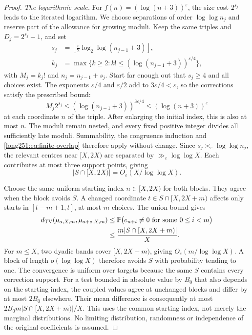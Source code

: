 \documentclass[11pt]{article}
\begin{document}
\begin{proof}
\par\medskip\noindent\emph{The logarithmic scale.}
For $f(n)=(\log(n+3))^\varepsilon$, the size cost $2^{s_j}$ leads to
the iterated logarithm.  We choose separations of order $\log\log n_j$
and reserve part of the allowance for growing moduli.  Keep the same
triples and $D_j=2^{s_j}-1$, and set
\begin{equation}\label{long251:eq:sparse-polylog-schedule}
 \begin{aligned}
 s_j&=\left\lfloor\frac{\varepsilon}{2}
               \log_2\log(n_{j-1}+3)\right\rfloor,\\
 k_j&=\max\{k\ge2:k!\le(\log(n_{j-1}+3))^{\varepsilon/4}\},
 \end{aligned}
\end{equation}
with $M_j=k_j!$ and $n_j=n_{j-1}+s_j$.  Start far enough out that
$s_j\ge4$ and all choices exist.  The exponents $\varepsilon/4$ and
$\varepsilon/2$ add to $3\varepsilon/4<\varepsilon$, so the corrections
satisfy the prescribed bound:
\[
 M_j2^{s_j}\le(\log(n_{j-1}+3))^{3\varepsilon/4}
             \le(\log(n+3))^\varepsilon
\]
at each coordinate $n$ of the triple.  After enlarging the initial
index, this is also at most $n$.  The moduli remain nested, and every fixed positive integer divides all
sufficiently late moduli.  Summability, the congruence induction and
\eqref{long251:eq:finite-overlap} therefore apply without change.  Since
$s_j\asymp_\varepsilon\log\log n_j$, the relevant centres near $[X,2X)$
are separated by $\gg_\varepsilon\log\log X$.  Each contributes at most
three support points, giving
\[
 |S\cap[X,2X)|=O_\varepsilon(X/\log\log X).
\]

Choose the same uniform starting index $n\in[X,2X)$ for both
blocks.  They agree when the block avoids $S$.  A changed coordinate
$t\in S\cap[X,2X+m)$ affects only starts in $[t-m+1,t]$, at most
$m$ choices.  The union bound gives
\[
 \begin{aligned}
 d_{\rm TV}(\mu_{a,X,m},\mu_{a+e,X,m})
 &\le\mathbb P\bigl(e_{n+i}\ne0\text{ for some }0\le i<m\bigr)\\
 &\le\frac{m|S\cap[X,2X+m)|}{X}.
 \end{aligned}
\]
For $m\le X$, two dyadic bands cover $[X,2X+m)$, giving
$O_\varepsilon(m/\log\log X)$.  A block of length $o(\log\log X)$
therefore avoids $S$ with probability tending to one.  The convergence
is uniform over targets because the same $S$ contains every correction
support.
For a test bounded in absolute value by $B_0$ that also depends on the
starting index, the coupled values agree at unchanged blocks and differ
by at most $2B_0$ elsewhere.  Their mean difference is consequently at
most $2B_0m|S\cap[X,2X+m)|/X$.  This uses the common starting index,
not merely the marginal distributions.  No limiting distribution,
randomness or independence of the original coefficients is assumed.
\end{proof}
\end{document}
